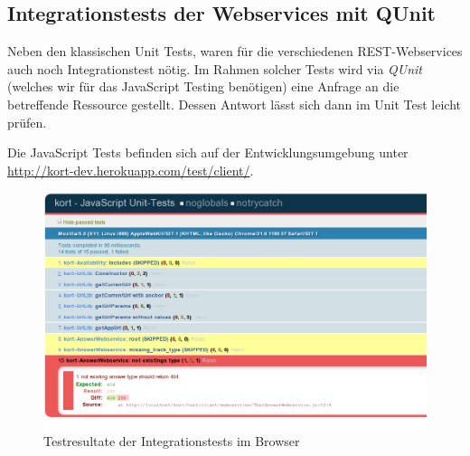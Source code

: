 \subsection{Integrationstests der Webservices mit QUnit}
Neben den klassischen Unit Tests, waren für die verschiedenen \gls{REST}-Webservices auch noch Integrationstest nötig.
Im Rahmen solcher Tests wird via \emph{QUnit} (welches wir für das JavaScript Testing benötigen) eine Anfrage an die betreffende Ressource gestellt.
Dessen Antwort lässt sich dann im Unit Test leicht prüfen.

Die JavaScript Tests befinden sich auf der Entwicklungsumgebung unter \url{http://kort-dev.herokuapp.com/test/client/}.

\begin{figure}[H]
	\centering
	\includegraphics[width=\textwidth]{images/implementation/backend/qunit-skipped-test}
	\caption{Testresultate der Integrationstests im Browser}
	\label{image-qunit-skipped-test}
\end{figure}